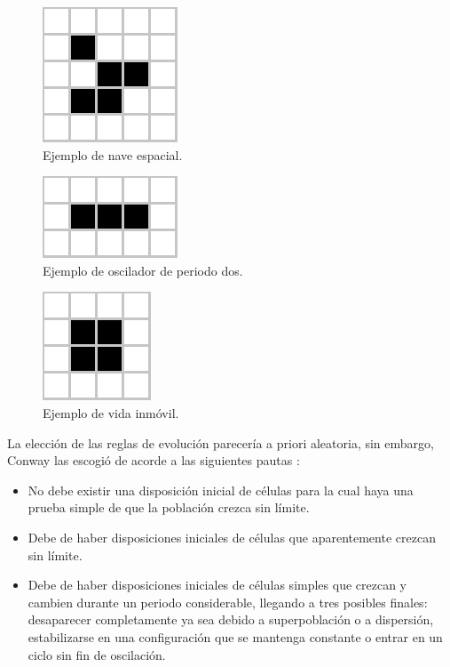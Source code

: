 \documentclass[../proyecto.tex]{book}
\begin{document}
\begin{figure}[H]
	\centering
	\includegraphics[height=.15\linewidth]{./images/glider.png}
	\caption{Ejemplo de nave espacial.}
	\label{fig:spaceship}
\end{figure} 
\begin{figure}[H]
	\centering
	\includegraphics[height=.125\linewidth]{./images/blinker.png}
	\caption{Ejemplo de oscilador de periodo dos.}
	\label{fig:blinker}
\end{figure} 
\begin{figure}[H]
	\centering
	\includegraphics[height=.15\linewidth]{./images/block.png}
	\caption{Ejemplo de vida inmóvil.}
	\label{fig:block}
\end{figure} 

La elección de las reglas de evolución parecería a priori aleatoria, sin embargo, Conway las escogió de acorde a las siguientes pautas \cite{libroGardner}:
\begin{itemize}
	\item No debe existir una disposición inicial de células para la cual haya una prueba simple de que la población crezca sin límite.
	\item Debe de haber disposiciones iniciales de células que aparentemente crezcan sin límite. 
	\item Debe de haber disposiciones iniciales de células simples que crezcan y cambien durante un periodo considerable, llegando a tres posibles finales: desaparecer completamente ya sea debido a superpoblación o a dispersión, estabilizarse en una configuración que se mantenga constante o entrar en un ciclo sin fin de oscilación.
\end{itemize}
\end{document}
